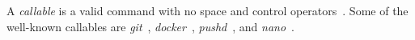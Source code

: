 A \emph{callable} is a valid command with no space and control operators~\cite{control_operators}. Some of the well-known callables are \emph{git}~\cite{git}, \emph{docker}~\cite{docker}, \emph{pushd}~\cite{pushd}, and \emph{nano}~\cite{nano}. 